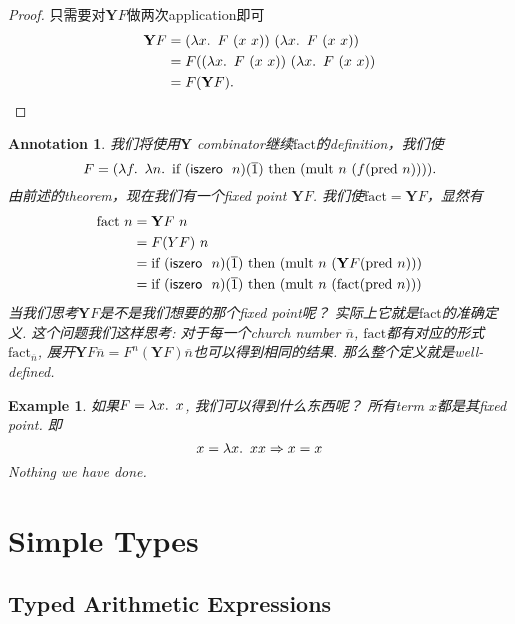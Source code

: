 \documentclass{article}
\theoremstyle{plain}
\newtheorem{example}[theorem]{Example}
\newtheorem{annotation}[theorem]{Annotation}
\theoremstyle{nonumberplain}
\newtheorem{proof}{Proof}
\newcommand{\lam}[2]{\ensuremath{\lambda #1\ldotp~ #2}} %
\newcommand{\term}[1]{\ensuremath\mathsf{#1}}
\newcommand{\iszero}[1]{\term{iszero}~#1}
\begin{document}
\begin{proof}
只需要对$\mathbf{Y}F$做两次application即可
$$
\begin{aligned}
\mathbf{Y}F &= (\lam{x}{F~(x~x)})~(\lam{x}{F~(x~x)}) \\
&= F((\lam{x}{F~(x~x)})~(\lam{x}{F~(x~x)}) \\
&= F(\mathbf{Y}F). 
\end{aligned}
$$
\end{proof}

\begin{annotation}
\rm 我们将使用$\mathbf{Y}$ combinator继续$\text{fact}$的definition，我们使\[F = (\lam{f}{\lam{n}{\text{if}~(\iszero~n)(\overline{1})~\text{then}~(\text{mult}~n~(f(\text{pred}~n)))}}).\]由前述的theorem，现在我们有一个fixed point $\mathbf{Y}F$. 我们使$\text{fact} = \mathbf{Y}F$，显然有
$$
\begin{aligned}
\text{fact}~n &= \mathbf{Y}F~n \\
&= F({Y}F)~n \\
&= \text{if}~(\iszero~n)(\overline{1})~\text{then}~(\text{mult}~n~(\mathbf{Y}F(\text{pred}~n))) \\
&= \text{if}~(\iszero~n)(\overline{1})~\text{then}~(\text{mult}~n~(\text{fact}(\text{pred}~n))) 
\end{aligned}
$$
当我们思考$\mathbf{Y}F$是不是我们想要的那个fixed point呢？ 实际上它就是$\text{fact}$的准确定义. 这个问题我们这样思考: 对于每一个church number $\overline{n}$, $\text{fact}$都有对应的形式$\text{fact}_{\overline{n}}$, 展开$\mathbf{Y}F \overline{n} = F^n(\mathbf{Y}F) \overline{n}	$也可以得到相同的结果. 那么整个定义就是well-defined. 
\end{annotation}

\begin{example}
\rm 如果$F = \lam{x}{x}$, 我们可以得到什么东西呢？ 所有term $x$都是其fixed point. 即
$$
x = \lam{x}{x} x  \Rightarrow x = x
$$
Nothing we have done. 
\end{example}


\newpage
\section{Simple Types}

\subsection{Typed Arithmetic Expressions}
\end{document}
